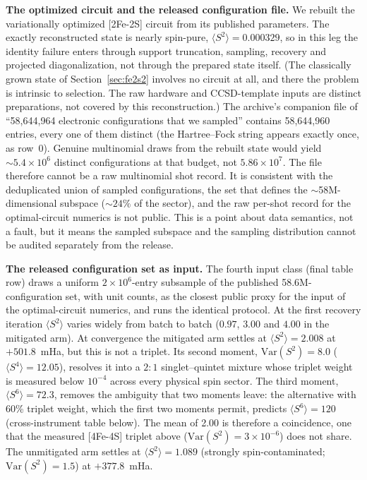 \documentclass[11pt]{article}
\newcommand{\ssq}{\ensuremath{\langle S^2\rangle}}
\begin{document}
\textbf{The optimized circuit and the released configuration file.} We rebuilt the variationally optimized [2Fe-2S] circuit from its published parameters. The exactly reconstructed state is nearly spin-pure, $\ssq = 0.000329$, so in this leg the identity failure enters through support truncation, sampling, recovery and projected diagonalization, not through the prepared state itself. (The classically grown state of Section~\ref{sec:fe2s2} involves no circuit at all, and there the problem is intrinsic to selection. The raw hardware and CCSD-template inputs are distinct preparations, not covered by this reconstruction.) The archive's companion file of ``58,644,964 electronic configurations that we sampled'' contains 58{,}644{,}960 entries, every one of them distinct (the Hartree--Fock string appears exactly once, as row~0). Genuine multinomial draws from the rebuilt state would yield ${\sim}5.4\times10^6$ distinct configurations at that budget, not $5.86\times10^7$. The file therefore cannot be a raw multinomial shot record. It is consistent with the deduplicated union of sampled configurations, the set that defines the ${\sim}$58M-dimensional subspace (${\sim}24\%$ of the sector), and the raw per-shot record for the optimal-circuit numerics is not public. This is a point about data semantics, not a fault, but it means the sampled subspace and the sampling distribution cannot be audited separately from the release.

\textbf{The released configuration set as input.} The fourth input class (final table row) draws a uniform $2\times10^6$-entry subsample of the published 58.6M-configuration set, with unit counts, as the closest public proxy for the input of the optimal-circuit numerics, and runs the identical protocol. At the first recovery iteration \ssq{} varies widely from batch to batch ($0.97$, $3.00$ and $4.00$ in the mitigated arm). At convergence the mitigated arm settles at $\ssq = 2.008$ at $+501.8$~mHa, but this is not a triplet. Its second moment, $\mathrm{Var}(S^2) = 8.0$ ($\langle S^4\rangle = 12.05$), resolves it into a $2{:}1$ singlet--quintet mixture whose triplet weight is measured below $10^{-4}$ across every physical spin sector. The third moment, $\langle S^6\rangle = 72.3$, removes the ambiguity that two moments leave: the alternative with 60\% triplet weight, which the first two moments permit, predicts $\langle S^6\rangle = 120$ (cross-instrument table below). The mean of 2.00 is therefore a coincidence, one that the measured [4Fe-4S] triplet above ($\mathrm{Var}(S^2) = 3\times10^{-6}$) does not share. The unmitigated arm settles at $\ssq = 1.089$ (strongly spin-contaminated; $\mathrm{Var}(S^2) = 1.5$) at $+377.8$~mHa.
\end{document}
